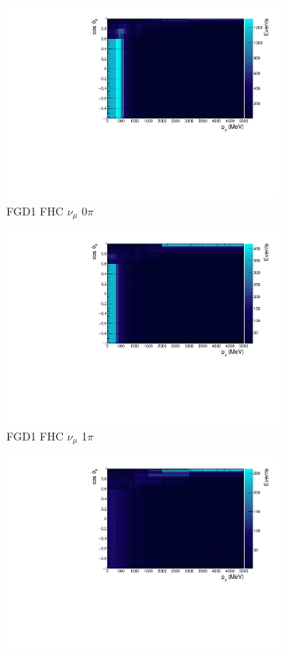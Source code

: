 \begin{figure}
\centering
\begin{subfigure}{.32\textwidth}
  \centering
  \includegraphics[width=0.95\linewidth]{figs/TH2D_MC_FGD1_numuCC_0pi}
  \caption{FGD1 FHC $\nu_{\mu}$ 0$\pi$}
  \label{fig:th2dFGD1_numuCC_0pi}
\end{subfigure}
\begin{subfigure}{.32\textwidth}
  \centering
  \includegraphics[width=0.95\linewidth]{figs/TH2D_MC_FGD1_numuCC_1pi}
  \caption{FGD1 FHC $\nu_{\mu}$ 1$\pi$}
  \label{fig:th2dFGD1_numuCC_1pi}
\end{subfigure}
\begin{subfigure}{.32\textwidth}
  \centering
  \includegraphics[width=0.95\linewidth]{figs/TH2D_MC_FGD1_numuCC_other}

\end{subfigure}
\end{figure}
